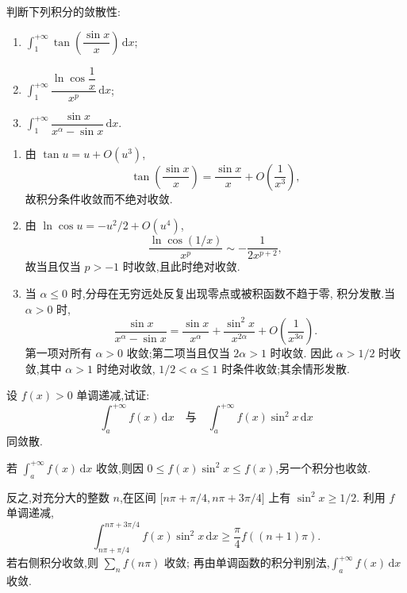 \begin{example}
  判断下列积分的敛散性:
  \begin{enumerate}
    \item $\displaystyle\int_1^{+\infty}\tan\left(\dfrac{\sin x}{x}\right)\,\mathrm{d}x$;
    \item $\displaystyle\int_1^{+\infty}\dfrac{\ln\cos\dfrac{1}{x}}{x^p}\,\mathrm{d}x$;
    \item $\displaystyle\int_1^{+\infty}\dfrac{\sin x}{x^\alpha-\sin x}\,\mathrm{d}x$.
  \end{enumerate}
\end{example}
\exampleblank

\begin{solution}
  \leavevmode
  \begin{enumerate}
    \item 由 $\tan u=u+O(u^3)$,
          \[
            \tan\left(\dfrac{\sin x}{x}\right)
            =\dfrac{\sin x}{x}+O\left(\dfrac{1}{x^3}\right),
          \]
          故积分条件收敛而不绝对收敛.
    \item 由 $\ln\cos u=-u^2/2+O(u^4)$,
          \[
            \dfrac{\ln\cos(1/x)}{x^p}\sim-\dfrac{1}{2x^{p+2}},
          \]
          故当且仅当 $p>-1$ 时收敛,且此时绝对收敛.
    \item 当 $\alpha\leq0$ 时,分母在无穷远处反复出现零点或被积函数不趋于零,
          积分发散.当 $\alpha>0$ 时,
          \[
            \dfrac{\sin x}{x^\alpha-\sin x}
            =\dfrac{\sin x}{x^\alpha}+\dfrac{\sin^2x}{x^{2\alpha}}
            +O\left(\dfrac{1}{x^{3\alpha}}\right).
          \]
          第一项对所有 $\alpha>0$ 收敛;第二项当且仅当 $2\alpha>1$ 时收敛.
          因此 $\alpha>1/2$ 时收敛,其中 $\alpha>1$ 时绝对收敛,
          $1/2<\alpha\leq1$ 时条件收敛;其余情形发散.
  \end{enumerate}
\end{solution}

\begin{example}
  设 $f(x)>0$ 单调递减,试证:
  \[
    \displaystyle\int_a^{+\infty}f(x)\,\mathrm{d}x
    \quad\text{与}\quad
    \int_a^{+\infty}f(x)\sin^2x\,\mathrm{d}x
  \]
  同敛散.
\end{example}
\exampleblank

\begin{solution}
  若 $\displaystyle\int_a^{+\infty}f(x)\,\mathrm{d}x$ 收敛,则因
  $0\leq f(x)\sin^2x\leq f(x)$,另一个积分也收敛.

  反之,对充分大的整数 $n$,在区间
  $\lbrack n\pi+\pi/4,n\pi+3\pi/4\rbrack$ 上有 $\sin^2x\geq1/2$.
  利用 $f$ 单调递减,
  \[
    \displaystyle\int_{n\pi+\pi/4}^{n\pi+3\pi/4}f(x)\sin^2x\,\mathrm{d}x
    \geq\dfrac{\pi}{4}f((n+1)\pi).
  \]
  若右侧积分收敛,则 $\displaystyle\sum\limits_n f(n\pi)$ 收敛;
  再由单调函数的积分判别法,$\displaystyle\int_a^{+\infty}f(x)\,\mathrm{d}x$ 收敛.
\end{solution}

